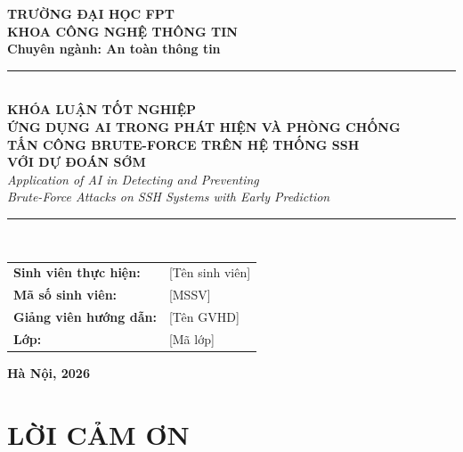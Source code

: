 \documentclass[13pt,a4paper,oneside]{report}
\begin{document}
\begin{titlepage}
\begin{center}
\textbf{\large TRƯỜNG ĐẠI HỌC FPT}\\[2pt]
\textbf{\large KHOA CÔNG NGHỆ THÔNG TIN}\\[2pt]
\textbf{Chuyên ngành: An toàn thông tin}\\[1cm]

\rule{\textwidth}{1pt}\\[1.5cm]

{\LARGE \textbf{KHÓA LUẬN TỐT NGHIỆP}}\\[0.8cm]

{\Large \textbf{ỨNG DỤNG AI TRONG PHÁT HIỆN VÀ PHÒNG CHỐNG}}\\[0.3cm]
{\Large \textbf{TẤN CÔNG BRUTE-FORCE TRÊN HỆ THỐNG SSH}}\\[0.3cm]
{\Large \textbf{VỚI DỰ ĐOÁN SỚM}}\\[0.8cm]

{\large \textit{Application of AI in Detecting and Preventing}}\\
{\large \textit{Brute-Force Attacks on SSH Systems with Early Prediction}}\\[1.5cm]

\rule{\textwidth}{1pt}\\[1.5cm]

\begin{tabular}{ll}
\textbf{Sinh viên thực hiện:} & [Tên sinh viên] \\
\textbf{Mã số sinh viên:} & [MSSV] \\
\textbf{Giảng viên hướng dẫn:} & [Tên GVHD] \\
\textbf{Lớp:} & [Mã lớp] \\
\end{tabular}

\vfill

{\large \textbf{Hà Nội, 2026}}
\end{center}
\end{titlepage}


\chapter*{LỜI CẢM ƠN}
\end{document}
